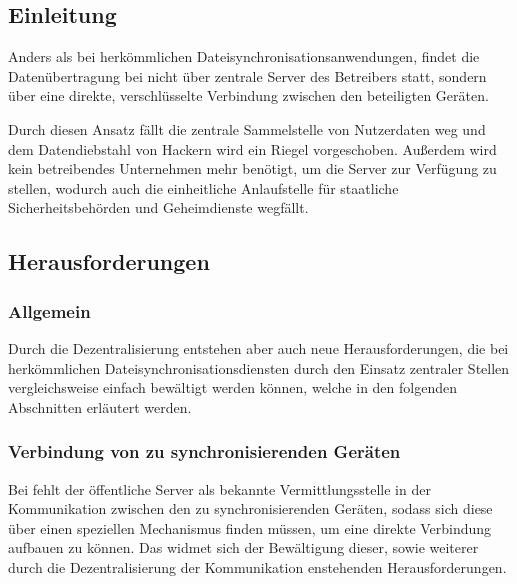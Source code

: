 \subsection{Einleitung}
Anders als bei herkömmlichen Dateisynchronisationsanwendungen, findet die
Datenübertragung bei \sblit nicht über zentrale Server des Betreibers statt,
sondern über eine direkte, verschlüsselte Verbindung zwischen den beteiligten
Geräten.

Durch diesen Ansatz fällt die zentrale Sammelstelle von Nutzerdaten
weg und dem Datendiebstahl von Hackern wird ein Riegel vorgeschoben. Außerdem
wird kein betreibendes Unternehmen mehr benötigt, um die Server zur Verfügung zu
stellen, wodurch auch die einheitliche Anlaufstelle für staatliche Sicherheitsbehörden
und Geheimdienste wegfällt.

\subsection{Herausforderungen}
\subsubsection{Allgemein}
Durch die Dezentralisierung entstehen aber auch neue Herausforderungen, die bei
herkömmlichen Dateisynchronisationsdiensten durch den Einsatz zentraler Stellen
vergleichsweise einfach bewältigt werden können, welche in den folgenden Abschnitten erläutert werden.

\subsubsection{Verbindung von zu synchronisierenden Geräten}
Bei \sblit fehlt der öffentliche Server als bekannte Vermittlungsstelle in der Kommunikation
zwischen den zu synchronisierenden Geräten, sodass sich diese über einen speziellen
Mechanismus finden müssen, um eine direkte Verbindung aufbauen zu können.
Das  widmet sich der Bewältigung dieser, sowie weiterer
durch die Dezentralisierung der Kommunikation enstehenden Herausforderungen.

